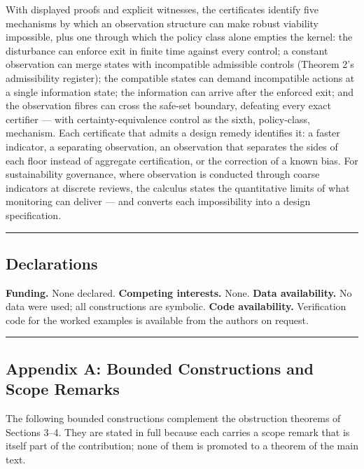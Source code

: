\documentclass[11pt]{article}
\begin{document}
With displayed proofs and explicit witnesses, the certificates identify
five mechanisms by which an observation structure can make robust
viability impossible, plus one through which the policy class alone
empties the kernel: the disturbance can enforce exit in finite time
against every control; a constant observation can merge states with
incompatible admissible controls (Theorem 2's admissibility register);
the compatible states can demand incompatible actions at a single
information state; the information can arrive after the enforced exit;
and the observation fibres can cross the safe-set boundary, defeating
every exact certifier --- with certainty-equivalence control as the
sixth, policy-class, mechanism. Each certificate that admits a design
remedy identifies it: a faster indicator, a separating observation, an
observation that separates the sides of each floor instead of aggregate
certification, or the correction of a known bias. For sustainability
governance, where observation is conducted through coarse indicators at
discrete reviews, the calculus states the quantitative limits of what
monitoring can deliver --- and converts each impossibility into a design
specification.

\begin{center}\rule{0.5\linewidth}{0.5pt}\end{center}

\subsection{Declarations}\label{declarations}

\textbf{Funding.} None declared. \textbf{Competing interests.} None.
\textbf{Data availability.} No data were used; all constructions are
symbolic. \textbf{Code availability.} Verification code for the worked
examples is available from the authors on request.

\begin{center}\rule{0.5\linewidth}{0.5pt}\end{center}

\subsection{Appendix A: Bounded Constructions and Scope
Remarks}\label{appendix-a-bounded-constructions-and-scope-remarks}

The following bounded constructions complement the obstruction theorems
of Sections 3--4. They are stated in full because each carries a scope
remark that is itself part of the contribution; none of them is promoted
to a theorem of the main text.
\end{document}
